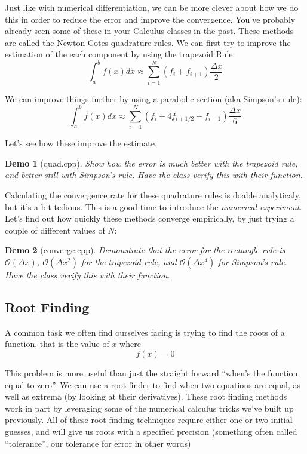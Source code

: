 \documentclass{article}
\theoremstyle{demo}
\newtheorem{demo}{Demo}[section]
\begin{document}
Just like with numerical differentiation, we can be more clever about how we do
this in order to reduce the error and improve the convergence.  You've probably
already seen some of these in your Calculus classes in the past.  These methods
are called the Newton-Cotes quadrature rules. We can first try to improve the
estimation of the each component by using the trapezoid Rule:
\begin{equation}
    \int_a^b f(x) dx \approx \sum_{i=1}^N (f_i + f_{i+1}) \frac{\Delta x}{2}
\end{equation}

We can improve things further by using a parabolic section (aka Simpson's rule):
\begin{equation}
    \int_a^b f(x) dx \approx \sum_{i=1}^N (f_i + 4f_{i+1/2}+f_{i+1}) \frac{\Delta x}{6}
\end{equation}

Let's see how these improve the estimate.

\begin{demo}[quad.cpp]
    Show how the error is much better with the trapezoid rule, and better still
    with Simpson's rule.  Have the class verify this with their function.
\end{demo}

Calculating the convergence rate for these quadrature rules is doable
analyticaly, but it's a bit tedious.  This is a good time to introduce the
\textit{numerical experiment}.  Let's find out how quickly these methods
converge empirically, by just trying a couple of different values of $N$:

\begin{demo}[converge.cpp]
    Demonstrate that the error for the rectangle rule is $\mathcal{O}(\Delta
    x)$, $\mathcal{O}(\Delta x^2)$ for the trapezoid rule, and
    $\mathcal{O}(\Delta x^4)$ for Simpson's rule.  Have the class verify this
    with their function.
\end{demo}

\subsection{Root Finding}
A common task we often find ourselves facing is trying to find the roots of a
function, that is the value of $x$ where
\begin{equation}
    f(x) = 0
\end{equation}

This problem is more useful than just the straight forward ``when's the function
equal to zero''.  We can use a root finder to find when two equations are equal,
as well as extrema (by looking at their derivatives).  These root finding
methods work in part by leveraging some of the numerical calculus tricks we've
built up previously.  All of these root finding techniques require either one or
two initial guesses, and will give us roots with a specified precision
(something often called ``tolerance'', our tolerance for error in other words)
\end{document}
